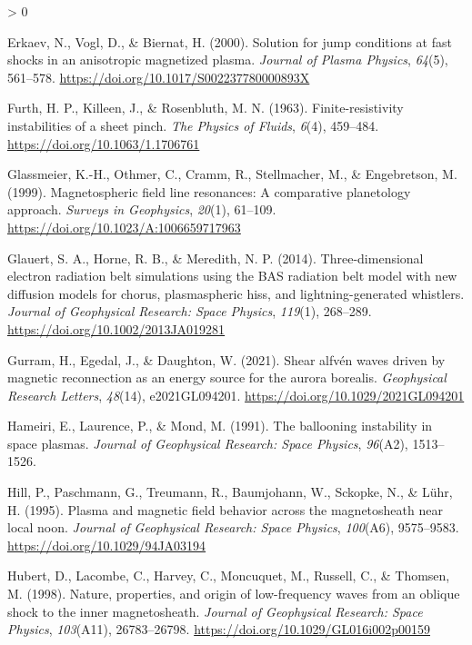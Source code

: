 \documentclass[
  notoc %
]{tufte-book}
\newlength{\cslhangindent}
\newenvironment{CSLReferences}[2] %
 {%
  \setlength{\parindent}{0pt}
  \ifodd #1 \everypar{\setlength{\hangindent}{\cslhangindent}}\ignorespaces\fi
  \ifnum #2 > 0
  \setlength{\parskip}{#2\baselineskip}
  \fi
 }%
 {}
\begin{document}
\begin{CSLReferences}{1}{0}
\leavevmode\hypertarget{ref-erkaev2000solution}{}%
Erkaev, N., Vogl, D., \& Biernat, H. (2000). Solution for jump
conditions at fast shocks in an anisotropic magnetized plasma.
\emph{Journal of Plasma Physics}, \emph{64}(5), 561--578.
\url{https://doi.org/10.1017/S002237780000893X}

\leavevmode\hypertarget{ref-furth1963finite}{}%
Furth, H. P., Killeen, J., \& Rosenbluth, M. N. (1963).
Finite-resistivity instabilities of a sheet pinch. \emph{The Physics of
Fluids}, \emph{6}(4), 459--484. \url{https://doi.org/10.1063/1.1706761}

\leavevmode\hypertarget{ref-glassmeier1999}{}%
Glassmeier, K.-H., Othmer, C., Cramm, R., Stellmacher, M., \&
Engebretson, M. (1999). Magnetospheric field line resonances: A
comparative planetology approach. \emph{Surveys in Geophysics},
\emph{20}(1), 61--109. \url{https://doi.org/10.1023/A:1006659717963}

\leavevmode\hypertarget{ref-glauert2014three}{}%
Glauert, S. A., Horne, R. B., \& Meredith, N. P. (2014).
Three-dimensional electron radiation belt simulations using the BAS
radiation belt model with new diffusion models for chorus, plasmaspheric
hiss, and lightning-generated whistlers. \emph{Journal of Geophysical
Research: Space Physics}, \emph{119}(1), 268--289.
\url{https://doi.org/10.1002/2013JA019281}

\leavevmode\hypertarget{ref-gurram2021shear}{}%
Gurram, H., Egedal, J., \& Daughton, W. (2021). Shear alfv{é}n waves
driven by magnetic reconnection as an energy source for the aurora
borealis. \emph{Geophysical Research Letters}, \emph{48}(14),
e2021GL094201. \url{https://doi.org/10.1029/2021GL094201}

\leavevmode\hypertarget{ref-hameiri1991ballooning}{}%
Hameiri, E., Laurence, P., \& Mond, M. (1991). The ballooning
instability in space plasmas. \emph{Journal of Geophysical Research:
Space Physics}, \emph{96}(A2), 1513--1526.

\leavevmode\hypertarget{ref-hill1995plasma}{}%
Hill, P., Paschmann, G., Treumann, R., Baumjohann, W., Sckopke, N., \&
Lühr, H. (1995). Plasma and magnetic field behavior across the
magnetosheath near local noon. \emph{Journal of Geophysical Research:
Space Physics}, \emph{100}(A6), 9575--9583.
\url{https://doi.org/10.1029/94JA03194}

\leavevmode\hypertarget{ref-hubert1998nature}{}%
Hubert, D., Lacombe, C., Harvey, C., Moncuquet, M., Russell, C., \&
Thomsen, M. (1998). Nature, properties, and origin of low-frequency
waves from an oblique shock to the inner magnetosheath. \emph{Journal of
Geophysical Research: Space Physics}, \emph{103}(A11), 26783--26798.
\url{https://doi.org/10.1029/GL016i002p00159}


\end{CSLReferences}
\end{document}
